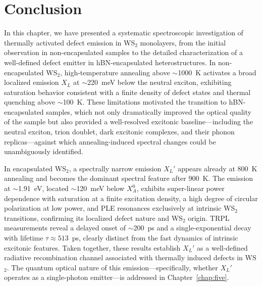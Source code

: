 \section{Conclusion}

In this chapter, we have presented a systematic spectroscopic investigation of thermally activated defect emission in WS$_2$ monolayers, from the initial observation in non-encapsulated samples to the detailed characterization of a well-defined defect emitter in hBN-encapsulated heterostructures. In non-encapsulated WS$_2$, high-temperature annealing above $\sim$1000~K activates a broad localized emission $X_L$ at $\sim$220~meV below the neutral exciton, exhibiting saturation behavior consistent with a finite density of defect states and thermal quenching above $\sim$100~K. These limitations motivated the transition to hBN-encapsulated samples, which not only dramatically improved the optical quality of the sample but also provided a well-resolved excitonic baseline---including the neutral exciton, trion doublet, dark excitonic complexes, and their phonon replicas---against which annealing-induced spectral changes could be unambiguously identified.

In encapsulated WS$_2$, a spectrally narrow emission $X_L'$ appears already at 800~K annealing and becomes the dominant spectral feature after 900~K. The emission at $\sim$1.91~eV, located $\sim$120~meV below $X_A^0$, exhibits super-linear power dependence with saturation at a finite excitation density, a high degree of circular polarization at low power, and PLE resonances exclusively at intrinsic WS$_2$ transitions, confirming its localized defect nature and WS$_2$ origin. TRPL measurements reveal a delayed onset of $\sim$200~ps and a single-exponential decay with lifetime $\tau \approx 513$~ps, clearly distinct from the fast dynamics of intrinsic excitonic features. Taken together, these results establish $X_L'$ as a well-defined radiative recombination channel associated with thermally induced defects in WS$_2$. The quantum optical nature of this emission---specifically, whether $X_L'$ operates as a single-photon emitter---is addressed in Chapter~\ref{chap:five}.














% 
% 